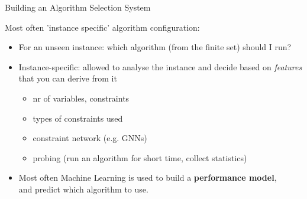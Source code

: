 \documentclass{cons-beamer}
\begin{document}
\begin{frame}{Building an Algorithm Selection System}

Most often 'instance specific' algorithm configuration:

\begin{itemize}
	\item For an unseen instance: which algorithm (from the finite set) should I run?
	\item Instance-specific: allowed to analyse the instance and decide based on \textit{features} that you can derive from it
	\begin{itemize}
		\item nr of variables, constraints
		\item types of constraints used
		\item constraint network (e.g. GNNs)
		\item probing (run an algorithm for short time, collect statistics)
	\end{itemize}
	\item Most often Machine Learning is used to build a \textbf{performance model},\\ and predict which algorithm to use.
\end{itemize}
\end{frame}
\end{document}
